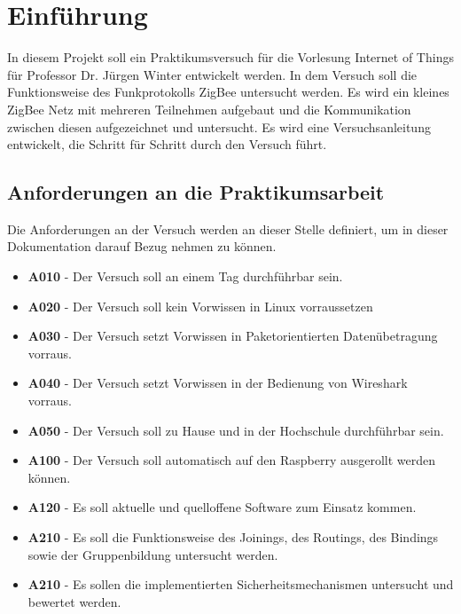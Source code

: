 \chapter{Einführung}

In diesem Projekt soll ein Praktikumsversuch für die Vorlesung Internet of Things für Professor Dr. Jürgen Winter 
entwickelt werden. In dem Versuch soll die Funktionsweise des Funkprotokolls ZigBee untersucht werden. Es wird ein kleines
ZigBee Netz mit mehreren Teilnehmen aufgebaut und die Kommunikation zwischen diesen aufgezeichnet und untersucht. 
Es wird eine Versuchsanleitung entwickelt, die Schritt für Schritt durch den Versuch führt.

\section{Anforderungen an die Praktikumsarbeit}

Die Anforderungen an der Versuch werden an dieser Stelle definiert, um in dieser Dokumentation 
darauf Bezug nehmen zu können.
\begin{itemize}
    \item \textbf{A010} - Der Versuch soll an einem Tag durchführbar sein.
    \item \textbf{A020} - Der Versuch soll kein Vorwissen in Linux vorraussetzen
    \item \textbf{A030} - Der Versuch setzt Vorwissen in Paketorientierten Datenübetragung vorraus.
    \item \textbf{A040} - Der Versuch setzt Vorwissen in der Bedienung von Wireshark vorraus.
    \item \textbf{A050} - Der Versuch soll zu Hause und in der Hochschule durchführbar sein.
    \item \textbf{A100} - Der Versuch soll automatisch auf den Raspberry ausgerollt werden können.
    \item \textbf{A120} - Es soll aktuelle und quelloffene Software zum Einsatz kommen.
    \item \textbf{A210} - Es soll die Funktionsweise des Joinings, des Routings, des Bindings sowie der Gruppenbildung untersucht werden.
    \item \textbf{A210} - Es sollen die implementierten Sicherheitsmechanismen untersucht und bewertet werden.
\end{itemize}

